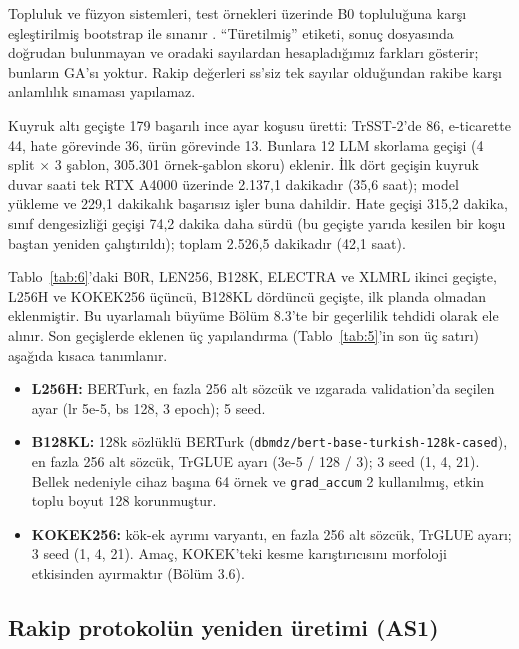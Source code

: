 \documentclass[11pt]{article}
\begin{document}
Topluluk ve füzyon sistemleri, test örnekleri üzerinde B0 topluluğuna karşı eşleştirilmiş bootstrap ile sınanır \citep{bergkirkpatrick2012}. ``Türetilmiş'' etiketi, sonuç dosyasında doğrudan bulunmayan ve oradaki sayılardan hesapladığımız farkları gösterir; bunların GA'sı yoktur. Rakip değerleri ss'siz tek sayılar olduğundan rakibe karşı anlamlılık sınaması yapılamaz.

Kuyruk altı geçişte 179 başarılı ince ayar koşusu üretti: TrSST-2'de 86, e-ticarette 44, hate görevinde 36, ürün görevinde 13. Bunlara 12 LLM skorlama geçişi (4 split $\times$ 3 şablon, 305.301 örnek-şablon skoru) eklenir. İlk dört geçişin kuyruk duvar saati tek RTX A4000 üzerinde 2.137,1 dakikadır (35,6 saat); model yükleme ve 229,1 dakikalık başarısız işler buna dahildir. Hate geçişi 315,2 dakika, sınıf dengesizliği geçişi 74,2 dakika daha sürdü (bu geçişte yarıda kesilen bir koşu baştan yeniden çalıştırıldı); toplam 2.526,5 dakikadır (42,1 saat).

Tablo~\ref{tab:6}'daki B0R, LEN256, B128K, ELECTRA ve XLMRL ikinci geçişte, L256H ve KOKEK256 üçüncü, B128KL dördüncü geçişte, ilk planda olmadan eklenmiştir. Bu uyarlamalı büyüme Bölüm 8.3'te bir geçerlilik tehdidi olarak ele alınır. Son geçişlerde eklenen üç yapılandırma (Tablo~\ref{tab:5}'in son üç satırı) aşağıda kısaca tanımlanır.

\begin{itemize}
\item \textbf{L256H:} BERTurk, en fazla 256 alt sözcük ve ızgarada validation'da seçilen ayar (lr 5e-5, bs 128, 3 epoch); 5 seed.
\item \textbf{B128KL:} 128k sözlüklü BERTurk (\texttt{dbmdz/\allowbreak{}\allowbreak{}bert-{}\allowbreak{}base-{}\allowbreak{}turkish-{}\allowbreak{}128k-{}\allowbreak{}cased}), en fazla 256 alt sözcük, TrGLUE ayarı (3e-5 / 128 / 3); 3 seed (1, 4, 21). Bellek nedeniyle cihaz başına 64 örnek ve \texttt{grad\_\allowbreak{}\allowbreak{}accum} 2 kullanılmış, etkin toplu boyut 128 korunmuştur.
\item \textbf{KOKEK256:} kök-ek ayrımı varyantı, en fazla 256 alt sözcük, TrGLUE ayarı; 3 seed (1, 4, 21). Amaç, KOKEK'teki kesme karıştırıcısını morfoloji etkisinden ayırmaktır (Bölüm 3.6).
\end{itemize}

\subsection{Rakip protokolün yeniden üretimi (AS1)}
\end{document}
